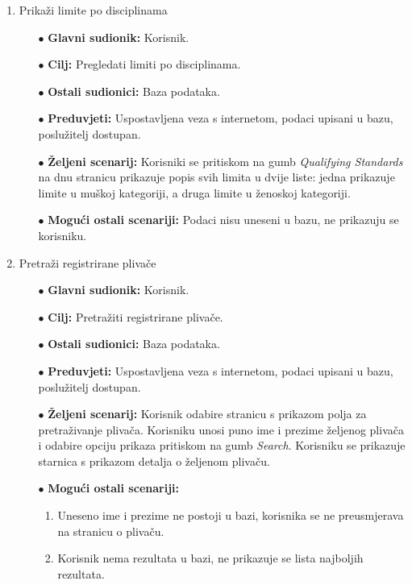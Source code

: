 \documentclass[times, utf8, zavrsni]{fer}
\begin{document}
\begin{enumerate}
    \item Prikaži limite po disciplinama
    \begin{itemize}
        \item[$\bullet$] \textbf{Glavni sudionik:} Korisnik.
        \item[$\bullet$] \textbf{Cilj:} Pregledati limiti po disciplinama.
        \item[$\bullet$] \textbf{Ostali sudionici:} Baza podataka.
        \item[$\bullet$] \textbf{Preduvjeti:} Uspostavljena veza s internetom, podaci upisani u bazu, poslužitelj dostupan.
        \item[$\bullet$] \textbf{Željeni scenarij:} Korisniki se pritiskom na gumb \textit{Qualifying Standards} na dnu stranicu prikazuje
        popis svih limita u dvije liste: jedna prikazuje limite u muškoj kategoriji, a druga limite u ženoskoj kategoriji.
        \item[$\bullet$] \textbf{Mogući ostali scenariji:} Podaci nisu uneseni u bazu, ne prikazuju se korisniku.
    \end{itemize}


    \item Pretraži registrirane plivače
    \begin{itemize}
        \item[$\bullet$] \textbf{Glavni sudionik:} Korisnik.
        \item[$\bullet$] \textbf{Cilj:} Pretražiti registrirane plivače.
        \item[$\bullet$] \textbf{Ostali sudionici:} Baza podataka.
        \item[$\bullet$] \textbf{Preduvjeti:} Uspostavljena veza s internetom, podaci upisani u bazu, poslužitelj dostupan.
        \item[$\bullet$] \textbf{Željeni scenarij:} Korisnik odabire stranicu s prikazom polja za pretraživanje plivača. Korisniku unosi puno
        ime i prezime željenog plivača i odabire opciju prikaza pritiskom na gumb \textit{Search}. Korisniku se prikazuje starnica s prikazom detalja o
        željenom plivaču.
        \item[$\bullet$] \textbf{Mogući ostali scenariji:} 
        \begin{enumerate}
            \item Uneseno ime i prezime ne postoji u bazi, korisnika se ne preusmjerava na stranicu o plivaču.
            \item Korisnik nema rezultata u bazi, ne prikazuje se lista najboljih rezultata.
        \end{enumerate}
    \end{itemize}



\end{enumerate}
\end{document}
